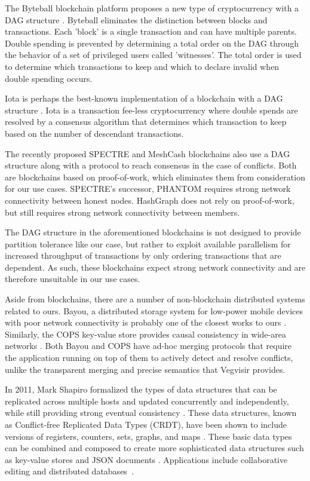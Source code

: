 \documentclass[conference, letterpaper]{IEEEtran}
\begin{document}
The Byteball blockchain platform proposes a new type of cryptocurrency with a DAG structure \cite{churyumov_byteball:_2015}. Byteball eliminates the distinction between blocks and transactions. Each 'block' is a single transaction and can have multiple parents. Double spending is prevented by determining a total order on the DAG through the behavior of a set of privileged users called 'witnesses'. The total order is used to determine which transactions to keep and which to declare invalid when double spending occurs. 

Iota is perhaps the best-known implementation of a blockchain with a DAG structure \cite{popov_tangle_2017}. Iota is a transaction fee-less cryptocurrency where double spends are resolved by a consensus algorithm that determines which transaction to keep based on the number of descendant transactions. 

The recently proposed SPECTRE \cite{sompolinsky2016spectre} and MeshCash \cite{bentov2017tortoise} blockchains also use a DAG structure along with a protocol to reach consensus in the case of conflicts. Both are blockchains based on proof-of-work, which eliminates them from consideration for our use cases. SPECTRE's successor, PHANTOM \cite{sompolinskyphantom} requires strong network connectivity between honest nodes. HashGraph \cite{baird2016swirlds} does not rely on proof-of-work, but still requires strong network connectivity between members. 

The DAG structure in the aforementioned blockchains is not designed to provide partition tolerance like our case, but rather to exploit available parallelism for increased throughput of transactions by only ordering transactions that are dependent. As such, these blockchains expect strong network connectivity and are therefore unsuitable in our use cases.

Aside from blockchains, there are a number of non-blockchain distributed systems related to ours. Bayou, a distributed storage system for low-power mobile devices with poor network connectivity is probably one of the closest works to ours \cite{terry1995managing}. Similarly, the COPS key-value store provides causal consistency in wide-area networks \cite{lloyd_dont_2011}. Both Bayou and COPS have ad-hoc merging protocols that require the application running on top of them to actively detect and resolve conflicts, unlike the transparent merging and precise semantics that Vegvisir provides.

In 2011, Mark Shapiro formalized the types of data structures that can be replicated across multiple hosts and updated concurrently and independently, while still providing strong eventual consistency \cite{shapiro_conflict-free_2011}. These data structures, known as Conflict-free Replicated Data Types (CRDT), have been shown to include versions of registers, counters, sets, graphs, and maps \cite{shapiro_comprehensive_2011}. These basic data types can be combined and composed to create more sophisticated data structures such as key-value stores \cite{noauthor_redis_nodate} and JSON documents \cite{kleppmann_conflict-free_2017}. Applications include collaborative editing \cite{lv_string-wise_2017} and distributed databases~\cite{b_getting_2017}. 
\end{document}
